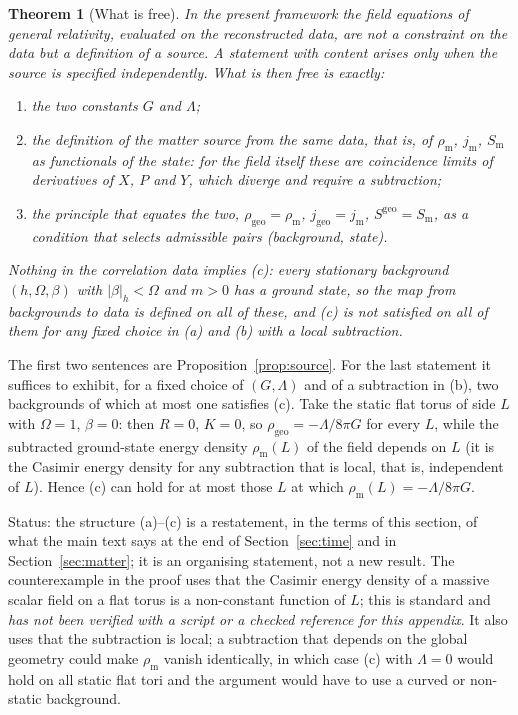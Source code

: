 \documentclass[11pt,a4paper]{article}
\makeatletter
\theoremstyle{stmt}
\newtheorem{theorem}{Theorem}[section]
\theoremstyle{defn}
\theoremstyle{rmk}
\renewenvironment{proof}[1][\proofname]{\par\pushQED{\qed}\normalfont\topsep6\p@\@plus6\p@\relax
  \trivlist\item[\hskip\labelsep{\sffamily\itshape\small #1.}]\ignorespaces}{\popQED\endtrivlist\@endpefalse}
\numberwithin{equation}{section}
\newcommand{\status}[1]{\par\noindent\textsf{\small Status: #1}\par}
\makeatother
\begin{document}
{\begin{theorem}[What is free]\label{thm:free}
In the present framework the field equations of general relativity, evaluated on the reconstructed data, are not a constraint on the data but a definition of a source. A statement with content arises only when the source is specified independently. What is then free is exactly:
\begin{enumerate}[label=\textup{(\alph*)}]
\item the two constants $G$ and $\Lambda$;
\item the definition of the matter source from the same data, that is, of $\rho_{\mathrm m}$, $j_{\mathrm m}$, $S_{\mathrm m}$ as functionals of the state: for the field itself these are coincidence limits of derivatives of $X$, $P$ and $Y$, which diverge and require a subtraction;
\item the principle that equates the two, $\rho_{\mathrm{geo}}=\rho_{\mathrm m}$, $j_{\mathrm{geo}}=j_{\mathrm m}$, $S^{\mathrm{geo}}=S_{\mathrm m}$, as a condition that selects admissible pairs (background, state).
\end{enumerate}
Nothing in the correlation data implies \textup{(c)}: every stationary background $(h,\Omega,\beta)$ with $|\beta|_h<\Omega$ and $m>0$ has a ground state, so the map from backgrounds to data is defined on all of these, and \textup{(c)} is not satisfied on all of them for any fixed choice in \textup{(a)} and \textup{(b)} with a local subtraction.
\end{theorem}

\begin{proof}
The first two sentences are Proposition~\ref{prop:source}. For the last statement it suffices to exhibit, for a fixed choice of $(G,\Lambda)$ and of a subtraction in (b), two backgrounds of which at most one satisfies (c). Take the static flat torus of side $L$ with $\Omega=1$, $\beta=0$: then $R=0$, $K=0$, so $\rho_{\mathrm{geo}}=-\Lambda/8\pi G$ for every $L$, while the subtracted ground-state energy density $\rho_{\mathrm m}(L)$ of the field depends on $L$ (it is the Casimir energy density for any subtraction that is local, that is, independent of $L$). Hence (c) can hold for at most those $L$ at which $\rho_{\mathrm m}(L)=-\Lambda/8\pi G$.
\end{proof}
\status{the structure (a)--(c) is a restatement, in the terms of this section, of what the main text says at the end of Section~\ref{sec:time} and in Section~\ref{sec:matter}; it is an organising statement, not a new result. The counterexample in the proof uses that the Casimir energy density of a massive scalar field on a flat torus is a non-constant function of $L$; this is standard and \emph{has not been verified with a script or a checked reference for this appendix}. It also uses that the subtraction is local; a subtraction that depends on the global geometry could make $\rho_{\mathrm m}$ vanish identically, in which case (c) with $\Lambda=0$ would hold on all static flat tori and the argument would have to use a curved or non-static background.}

}
\end{document}

